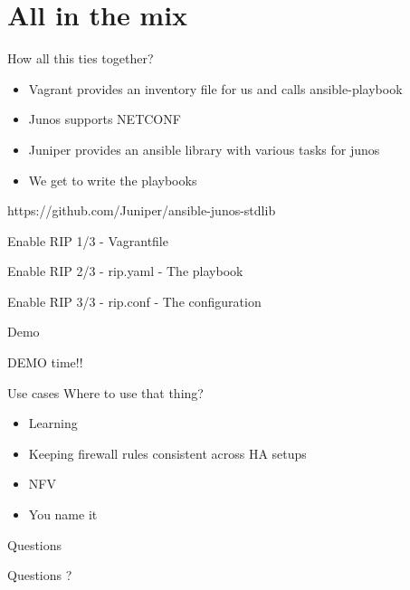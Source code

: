 \documentclass{beamer}
\begin{document}
\section{All in the mix}
    \begin{frame}{How all this ties together?}
        \begin{itemize}
            \pause \item Vagrant provides an inventory file for us and calls ansible-playbook
            \pause \item Junos supports NETCONF
	    \pause \item Juniper provides an ansible library with various tasks for junos
            \pause \item We get to write the playbooks
        \end{itemize}
	\pause https://github.com/Juniper/ansible-junos-stdlib
    \end{frame}
    \begin{frame}{Enable RIP 1/3 - Vagrantfile}
        
    \end{frame}
    \begin{frame}{Enable RIP 2/3 - rip.yaml - The playbook}
        
    \end{frame}
    \begin{frame}{Enable RIP 3/3 - rip.conf - The configuration}
        
    \end{frame}
    \begin{frame}{Demo}
        \begin{center}
            \Huge DEMO time!!
        \end{center}
    \end{frame}
    \begin{frame}{Use cases}
        Where to use that thing?
        \begin{itemize}
            \pause \item Learning
            \pause \item Keeping firewall rules consistent across HA setups
            \pause \item NFV
            \pause \item You name it
        \end{itemize}
    \end{frame}
    \begin{frame}{Questions}
        \begin{center}
            \Huge Questions ?
        \end{center}
    \end{frame}
\end{document}

